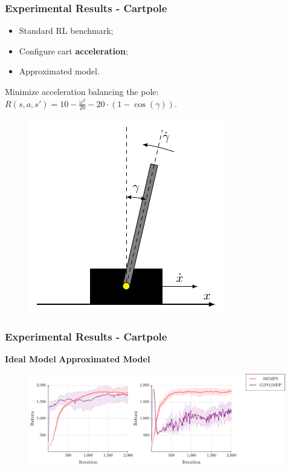 \documentclass[english,aspectratio=1610]{beamer}
\theoremstyle{mystyle}
\theoremstyle{mystyle}
\theoremstyle{mystyle}
\begin{document}
\begin{frame}
	\frametitle{Experimental Results - Cartpole}
\begin{itemize}
 	\item Standard RL benchmark;
 	\item Configure cart \textbf{acceleration};
 	\item Approximated model.
 	\end{itemize}
Minimize acceleration balancing the pole: \newline
$
R(s,a,s') = 10 - \frac{\omega^2}{20} - 20 \cdot (1 - \cos(\gamma)) .
 $
 	\vspace{-3cm}
	\begin{figure}
	\hspace{2cm}
		\includegraphics[height=0.7\textheight]{plots/cartpole/cartpole_env}
	\end{figure}
\end{frame}

\begin{frame}
	\frametitle{Experimental Results - Cartpole}
	\hspace{2cm} \textbf{Ideal Model} \hspace{3cm} \textbf{Approximated Model}
	\vspace{-1cm}
	\begin{figure}
		\includegraphics[width=1\textwidth]{plots/cartpole/plot_cartpole_experiment_small}
	\end{figure}
\end{frame}
\end{document}
